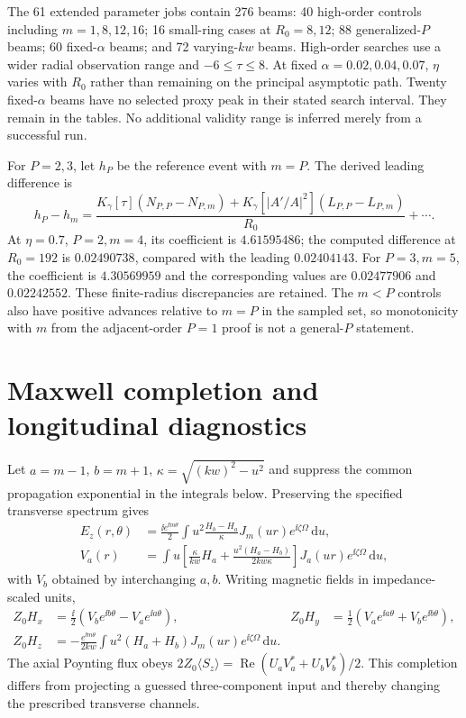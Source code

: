 The 61 extended parameter jobs contain 276 beams: 40 high-order controls
including $m=1,8,12,16$; 16 small-ring cases at $R_0=8,12$;
88 generalized-$P$ beams; 60 fixed-$\alpha$ beams; and 72 varying-$kw$
beams. High-order searches use a wider radial observation range and
$-6\leq\tau\leq8$. At fixed $\alpha=0.02,0.04,0.07$,
$\eta$ varies with $R_0$ rather than remaining on the principal
asymptotic path. Twenty fixed-$\alpha$ beams have no selected proxy
peak in their stated search interval. They remain in the tables.
No additional validity range is inferred merely from a successful run.

For $P=2,3$, let $h_P$ be the reference event with $m=P$.
The derived leading difference is
\begin{equation}
h_P-h_m=\frac{K_\gamma[\tau](N_{P,P}-N_{P,m})
+K_\gamma[|A'/A|^2](L_{P,P}-L_{P,m})}{R_0}+\cdots.
\end{equation}
At $\eta=0.7$, $P=2,m=4$, its coefficient is $4.61595486$;
the computed difference at $R_0=192$ is $0.02490738$, compared with
the leading $0.02404143$. For $P=3,m=5$, the coefficient is
$4.30569959$ and the corresponding values are $0.02477906$ and
$0.02242552$. These finite-radius discrepancies are retained.
The $m<P$ controls also have positive advances relative to $m=P$
in the sampled set, so monotonicity with $m$ from the adjacent-order
$P=1$ proof is not a general-$P$ statement.

\section{Maxwell completion and longitudinal diagnostics}
\label{sec:si-maxwell}
Let $a=m-1$, $b=m+1$, $\kappa=\sqrt{(kw)^2-u^2}$ and suppress
the common propagation exponential in the integrals below. Preserving
the specified transverse spectrum gives
\begin{align}
E_z(r,\theta)&=\frac{\ii e^{\ii m\theta}}2
\int u^2\frac{H_b-H_a}{\kappa}J_m(ur)e^{\ii\zeta\Omega}\,\mathrm{d}u,\\
V_a(r)&=\int u\left[\frac{\kappa}{kw}H_a+
\frac{u^2(H_a-H_b)}{2kw\kappa}\right]J_a(ur)e^{\ii\zeta\Omega}\,\mathrm{d}u,
\end{align}
with $V_b$ obtained by interchanging $a,b$.
Writing magnetic fields in impedance-scaled units,
\begin{align}
Z_0H_x&=\tfrac\ii2(V_be^{\ii b\theta}-V_ae^{\ii a\theta}),&
Z_0H_y&=\tfrac12(V_ae^{\ii a\theta}+V_be^{\ii b\theta}),\\
Z_0H_z&=-\frac{e^{\ii m\theta}}{2kw}
\int u^2(H_a+H_b)J_m(ur)e^{\ii\zeta\Omega}\,\mathrm{d}u.
\end{align}
The axial Poynting flux obeys
$2Z_0\langle S_z\rangle=\operatorname{Re}(U_aV_a^*+U_bV_b^*)/2$.
This completion differs from projecting a guessed three-component
input and thereby changing the prescribed transverse channels.

